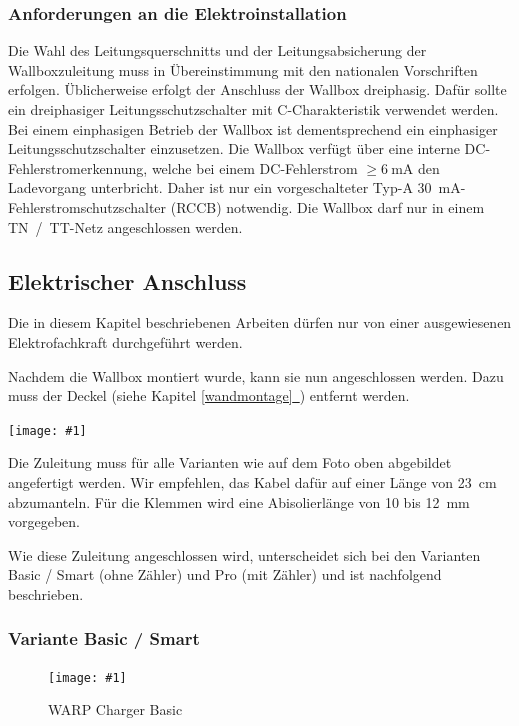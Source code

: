 \documentclass[a4paper,10pt]{article}
\newcommand{\hint}[1]{\begin{tcolorbox}[colback=boxgray,colframe=black,coltext=
white,title=Hinweis,left*=2mm,right*=2mm,boxsep=1mm,bottom=1mm,top=1mm]#1\end{tcolorbox}}
\newcommand{\gfx}[1]{\texttt{[image: \#1]}}
\newcommand*{\fullref}[1]{\hyperref[{#1}]{\ref*{#1}~\nameref*{#1}}}
\begin{document}
\begin{multicols*}{2}
	\subsubsection{Anforderungen an die Elektroinstallation}
	Die Wahl des Leitungsquerschnitts und der Lei\-tungs\-ab\-sicher\-ung der
	Wallboxzuleitung muss in Übereinstimmung mit den nationalen Vorschriften
	erfolgen. Üblicherweise erfolgt der Anschluss der Wallbox dreiphasig.
	Dafür sollte ein dreiphasiger Leitungsschutzschalter mit C-Charakteristik
	verwendet werden. Bei einem einphasigen Betrieb der Wallbox ist
	dementsprechend ein einphasiger Leitungsschutzschalter einzusetzen.
	Die Wallbox verfügt über eine interne DC-Fehlerstromerkennung, welche
	bei einem DC-Fehlerstrom $\geq \SI{6}{\milli\ampere}$ den Ladevorgang
	unterbricht. Daher ist nur ein vorgeschalteter Typ-A \SI{30}{\milli\ampere}-Fehlerstromschutzschalter (RCCB)
	notwendig.
	Die Wallbox darf nur in einem TN~/~TT-Netz angeschlossen werden.

	\newpage
	\subsection{Elektrischer Anschluss}
	\hint{Die in diesem Kapitel beschriebenen Arbeiten dürfen nur von einer ausgewiesenen
		Elektrofachkraft durchgeführt werden.}

	Nachdem die Wallbox montiert wurde, kann sie nun angeschlossen werden. Dazu
	muss der Deckel (siehe Kapitel \fullref{wandmontage}) entfernt werden.

	\gfx{./img_warp2/resized/warp_cable_cut_ready}

	Die Zuleitung muss für alle Varianten wie auf dem Foto oben abgebildet
	angefertigt werden. Wir empfehlen, das Kabel dafür auf einer Länge von
	\SI{23}{\centi\meter} abzumanteln. Für die Klemmen wird eine
	Abisolierlänge von 10 bis \SI{12}{\milli\meter} vorgegeben.

	Wie diese Zuleitung angeschlossen wird, unterscheidet sich bei
	den Varianten Basic / Smart (ohne Zähler) und Pro (mit Zähler) und ist
	nachfolgend beschrieben.

	\subsubsection{Variante Basic / Smart}

	\begin{figure}[H]
		\gfx{./img_warp2/resized/warp2_basic_top_open}
		\caption*{WARP Charger Basic}
	\end{figure}


\end{multicols*}
\end{document}
